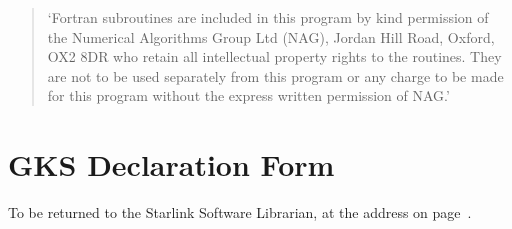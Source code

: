 \begin{quote}
`Fortran subroutines are included in this program by kind permission of the
Numerical Algorithms Group Ltd (NAG), Jordan Hill Road, Oxford, OX2 8DR who
retain all intellectual property rights to the routines. They are not to be
used separately from this program or any charge to be made for this program
without the express written permission of NAG.'
\end{quote}

\newpage

\section{GKS Declaration Form} 
\label{se:gdf} 
To be returned to the Starlink Software Librarian, at the address on 
page~\pageref{pa:add}.

